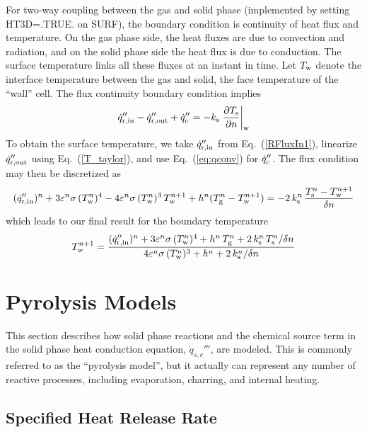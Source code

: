 For two-way coupling between the gas and solid phase (implemented by setting {\ct HT3D=.TRUE.} on {\ct SURF}), the boundary condition is continuity of heat flux and temperature.  On the gas phase side, the heat fluxes are due to convection and radiation, and on the solid phase side the heat flux is due to conduction.  The surface temperature links all these fluxes at an instant in time.  Let $T_{\rm w}$ denote the interface temperature between the gas and solid, the face temperature of the ``wall'' cell.  The flux continuity boundary condition implies
\begin{equation}
\label{eq:fluxcontinuity}
\dot{q}_{\rm r, in}'' - \dot{q}_{\rm r, out}'' + \dot{q}_{\rm c}'' = -k_{\rm s} \left. \frac{\partial T_{\rm s}}{\partial n} \right|_{\rm w}
\end{equation}
To obtain the surface temperature, we take $\dot{q}_{\rm r, in}''$ from Eq.~(\ref{RFluxIn1}), linearize $\dot{q}_{\rm r, out}''$ using Eq.~(\ref{T_taylor}), and use Eq.~(\ref{eq:qconv}) for $\dot{q}_{\rm c}''$. The flux condition may then be discretized as
\begin{equation}
\label{eq:discflux}
( \dot{q}_{\rm r, in}'' )^n + 3 \varepsilon^n \sigma \, (T_{\rm w}^n)^4 - 4 \varepsilon^n \sigma \, (T_{\rm w}^n)^3 \, T_{\rm w}^{n+1} + h^n (T_{\rm g}^n - T_{\rm w}^{n+1}) = -2 \, k_{\rm s}^n \, \frac{T_{\rm s}^n - T_{\rm w}^{n+1}}{\delta n}
\end{equation}
which leads to our final result for the boundary temperature
\begin{equation}
\label{eq:tmpwall}
T_{\rm w}^{n+1} = \frac{ ( \dot{q}_{\rm r, in}'' )^n + 3 \varepsilon^n \sigma \, (T_{\rm w}^n)^4 + h^n \, T_{\rm g}^n + 2 \, k_{\rm s}^n \, T_{\rm s}^n/\delta n }{ 4 \varepsilon^n \sigma \, (T_{\rm w}^n)^3 + h^n + 2 \, k_{\rm s}^n / \delta n}
\end{equation}

\newpage
\section{Pyrolysis Models}
\label{pyrosection}

This section describes how solid phase reactions and the chemical source term in the solid phase heat conduction equation, $\dot{q}_{s,c}'''$,  are modeled. This is commonly referred to as the ``pyrolysis model'', but it actually can represent any number of reactive processes, including evaporation, charring, and internal heating.


\subsection{Specified Heat Release Rate}

